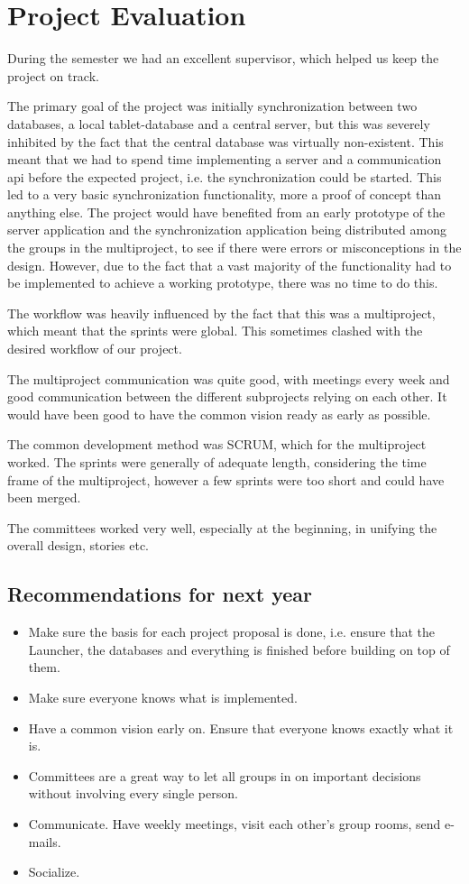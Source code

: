 \section{Project Evaluation}
During the semester we had an excellent supervisor, which helped us keep the project on track.

The primary goal of the project was initially synchronization between two databases, a local tablet-database and a central server, but this was severely inhibited by the fact that the central database was virtually non-existent. This meant that we had to spend time implementing a server and a communication \ac{api} before the expected project, i.e. the synchronization could be started. This led to a very basic synchronization functionality, more a proof of concept than anything else. The project would have benefited from an early prototype of the server application and the synchronization application being distributed among the groups in the multiproject, to see if there were errors or misconceptions in the design. However, due to the fact that a vast majority of the functionality had to be implemented to achieve a working prototype, there was no time to do this.

The workflow was heavily influenced by the fact that this was a multiproject, which meant that the sprints were global. This sometimes clashed with the desired workflow of our project. 

The multiproject communication was quite good, with meetings every week and good communication between the different subprojects relying on each other. It would have been good to have the common vision ready as early as possible. 

The common development method was SCRUM, which for the multiproject worked. The sprints were generally of adequate length, considering the time frame of the multiproject, however a few sprints were too short and could have been merged. 

The committees worked very well, especially at the beginning, in unifying the overall design, stories etc.

\subsection{Recommendations for next year}
\begin{itemize}
\item Make sure the basis for each project proposal is done, i.e. ensure that the Launcher, the databases and everything is finished before building on top of them. 
\item Make sure everyone knows what is implemented.
\item Have a common vision early on. Ensure that everyone knows exactly what it is.
\item Committees are a great way to let all groups in on important decisions without involving every single person.
\item Communicate. Have weekly meetings, visit each other's group rooms, send e-mails.
\item Socialize.
\end{itemize}
